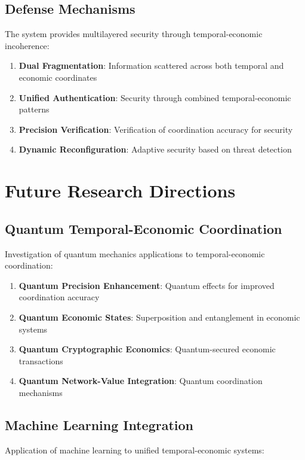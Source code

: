 \documentclass[12pt,a4paper]{article}
\begin{document}
\subsection{Defense Mechanisms}

The system provides multilayered security through temporal-economic incoherence:

\begin{enumerate}
\item \textbf{Dual Fragmentation}: Information scattered across both temporal and economic coordinates
\item \textbf{Unified Authentication}: Security through combined temporal-economic patterns
\item \textbf{Precision Verification}: Verification of coordination accuracy for security
\item \textbf{Dynamic Reconfiguration}: Adaptive security based on threat detection
\end{enumerate}

\section{Future Research Directions}

\subsection{Quantum Temporal-Economic Coordination}

Investigation of quantum mechanics applications to temporal-economic coordination:

\begin{enumerate}
\item \textbf{Quantum Precision Enhancement}: Quantum effects for improved coordination accuracy
\item \textbf{Quantum Economic States}: Superposition and entanglement in economic systems
\item \textbf{Quantum Cryptographic Economics}: Quantum-secured economic transactions
\item \textbf{Quantum Network-Value Integration}: Quantum coordination mechanisms
\end{enumerate}

\subsection{Machine Learning Integration}

Application of machine learning to unified temporal-economic systems:
\end{document}
